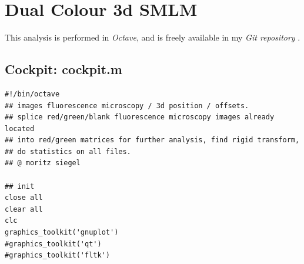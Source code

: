 \documentclass[11pt, a4paper, oneside, twocolumn]{report}
\newcommand{\e}{\emph}
\newcommand{\x}[1]{#1\index{#1}}
\begin{document}
\clearpage\section{Dual Colour 3d SMLM}\label{s:c:dc}

This analysis is performed in \e{\x{Octave}}, and is freely available
in my \e{Git repository} \cite{sie21}.

\subsection{Cockpit: cockpit.m}\label{s:c:cockpit}

\begin{verbatim}
#!/bin/octave
## images fluorescence microscopy / 3d position / offsets.
## splice red/green/blank fluorescence microscopy images already located
## into red/green matrices for further analysis, find rigid transform,
## do statistics on all files.
## @ moritz siegel

## init
close all
clear all
clc
graphics_toolkit('gnuplot')
#graphics_toolkit('qt')
#graphics_toolkit('fltk')


\end{verbatim}
\end{document}
